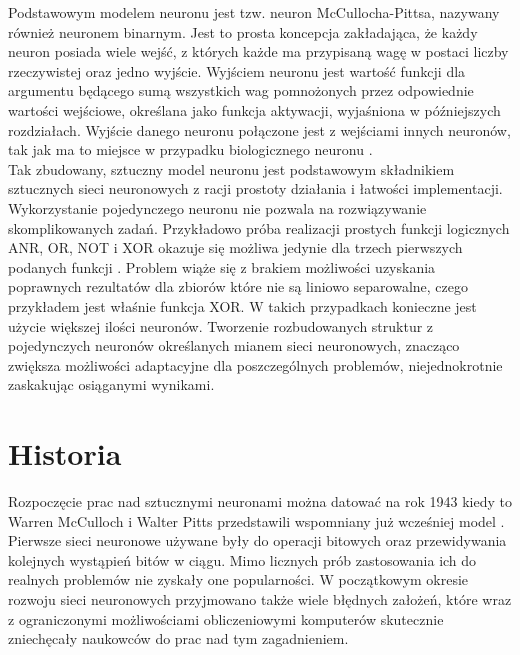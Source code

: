 Podstawowym modelem neuronu jest tzw. neuron McCullocha-Pittsa, nazywany
również neuronem binarnym. Jest to prosta koncepcja zakładająca, że każdy neuron
posiada wiele wejść, z których każde ma przypisaną wagę w postaci liczby
rzeczywistej oraz jedno wyjście. Wyjściem neuronu jest wartość funkcji
dla argumentu będącego sumą wszystkich wag pomnożonych przez odpowiednie
wartości wejściowe, określana jako funkcja aktywacji, wyjaśniona w późniejszych rozdziałach.
Wyjście danego neuronu połączone jest z wejściami innych
neuronów, tak jak ma to miejsce w przypadku biologicznego neuronu \cite{CS231n}.\\
Tak zbudowany, sztuczny model neuronu jest podstawowym składnikiem sztucznych sieci
neuronowych z racji prostoty działania i łatwości implementacji.\\
Wykorzystanie pojedynczego neuronu nie pozwala na rozwiązywanie skomplikowanych zadań.
Przykładowo próba realizacji prostych funkcji logicznych ANR, OR, NOT i XOR okazuje
się możliwa jedynie dla trzech pierwszych podanych funkcji \cite{XORproblem}.
Problem wiąże się z brakiem możliwości uzyskania poprawnych rezultatów dla zbiorów które
nie są liniowo separowalne, czego przykładem jest właśnie funkcja XOR. W takich przypadkach
konieczne jest użycie większej ilości neuronów. Tworzenie rozbudowanych struktur z pojedynczych
neuronów określanych mianem sieci neuronowych, znacząco zwiększa możliwości adaptacyjne
dla poszczególnych problemów, niejednokrotnie zaskakując osiąganymi wynikami.

\section{Historia}

Rozpoczęcie prac nad sztucznymi neuronami można datować na rok 1943 kiedy to
Warren McCulloch i Walter Pitts przedstawili wspomniany już wcześniej model \cite{NNbiology}.
Pierwsze sieci neuronowe używane były do operacji bitowych oraz przewidywania kolejnych
wystąpień bitów w ciągu. Mimo licznych prób zastosowania ich do realnych problemów
nie zyskały one popularności. W początkowym okresie rozwoju sieci neuronowych
przyjmowano także wiele błędnych założeń, które wraz z ograniczonymi możliwościami
obliczeniowymi komputerów skutecznie zniechęcały naukowców do prac nad tym zagadnieniem.\\
